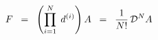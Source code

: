 \begin{equation}
F \;\; = \;\; \left( \prod_{i=1}^{N} \; d^{(i)} \right) A \;\; =
\;\; {1 \over N!} \, {\cal{D}}^N A
\label{eq:4.17}
\end{equation}

